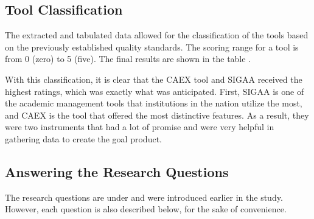 \subsection{Tool Classification}\label{sec:gl-tool-classification}

The extracted and tabulated data allowed for the classification of the tools based on the previously established quality standards. The scoring range for a tool is from 0 (zero) to 5 (five). The final results are shown in the table .



With this classification, it is clear that the \ac{CAEX} tool and \ac{SIGAA} received the highest ratings, which was exactly what was anticipated. First, \ac{SIGAA} is one of the academic management tools that institutions in the nation utilize the most, and \ac{CAEX} is the tool that offered the most distinctive features. As a result, they were two instruments that had a lot of promise and were very helpful in gathering data to create the goal product.

\subsection{Answering the Research Questions}\label{sec:gl-answer-research-questions}

The research questions are under  and were introduced earlier in the study. However, each question is also described below, for the sake of convenience.

